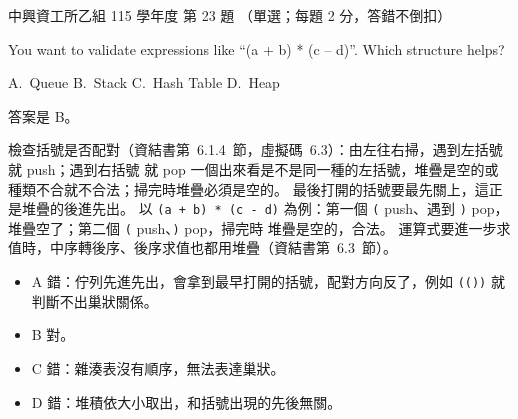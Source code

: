 \begin{pastexam}[label={px:nchu-115-is-23}]{中興資工所乙組 115 學年度 第 23 題}
（單選；每題 2 分，答錯不倒扣）

You want to validate expressions like ``(a + b) * (c -- d)''. Which structure helps?

A.~Queue \qquad B.~Stack \qquad C.~Hash Table \qquad D.~Heap
\end{pastexam}

\begin{pastsoln}
答案是 B。

檢查括號是否配對（資結書第~6.1.4~節，虛擬碼~6.3）：由左往右掃，遇到左括號就 push；遇到右括號
就 pop 一個出來看是不是同一種的左括號，堆疊是空的或種類不合就不合法；掃完時堆疊必須是空的。
最後打開的括號要最先關上，這正是堆疊的後進先出。 以 \texttt{(a + b) * (c - d)} 為例：第一個
\texttt{(} push、遇到 \texttt{)} pop，堆疊空了；第二個 \texttt{(} push、\texttt{)} pop，掃完時
堆疊是空的，合法。 運算式要進一步求值時，中序轉後序、後序求值也都用堆疊（資結書第~6.3~節）。
\begin{itemize}
\item A 錯：佇列先進先出，會拿到最早打開的括號，配對方向反了，例如 \texttt{(()}\texttt{)}
就判斷不出巢狀關係。
\item B 對。
\item C 錯：雜湊表沒有順序，無法表達巢狀。
\item D 錯：堆積依大小取出，和括號出現的先後無關。
\end{itemize}
\end{pastsoln}
